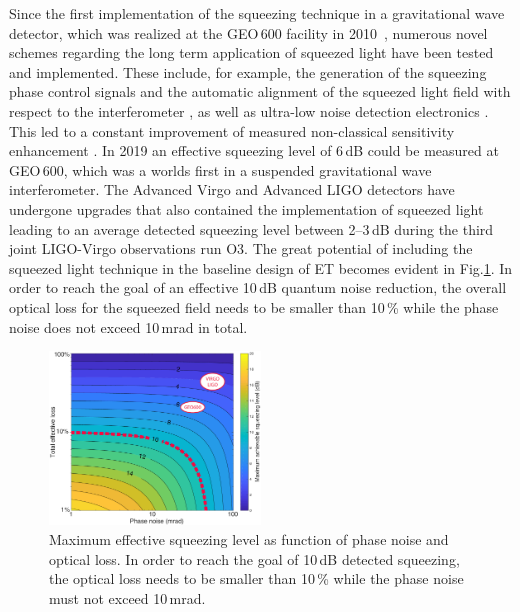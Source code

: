 \label{subsec:FDS}
Since the first implementation of the squeezing technique in a gravitational wave detector, which was realized at the GEO\,600 facility in 2010~\cite{GEOsqueezing}, numerous novel schemes regarding the long term application of squeezed light have been tested and implemented. These include, for example, the generation of the squeezing phase control signals \cite{Dooley2015} and the automatic alignment of the squeezed light field with respect to the interferometer \cite{Schreiber2016}, as well as ultra-low noise detection electronics \cite{Grote2016}. This led to a constant improvement of measured non-classical sensitivity enhancement \cite {Grote2013,Dooley2016}. In 2019 an effective squeezing level of 6\,dB could be measured at GEO\,600, which was a worlds first in a suspended gravitational wave interferometer. 
The Advanced Virgo and Advanced LIGO detectors have undergone upgrades that also contained the implementation of squeezed light leading to an average detected squeezing level between 2--3\,dB during the third joint LIGO-Virgo observations run O3. 
%
The great potential of including the squeezed light technique in the baseline design of ET becomes evident in Fig.\ref{QNSQZvsPNandloss}. In order to reach the goal of an effective 10\,dB quantum noise reduction, the overall optical loss for the squeezed field needs to be smaller than 10\,\% while the phase noise does not exceed 10\,mrad in total. 
%
\begin{figure}
	\centering
		\includegraphics[width=0.5\textwidth]{./Detector/DetFigures/QNSQZvsPNandLoss.pdf}
	\caption{Maximum effective squeezing level as function of phase noise and optical loss. In order to reach the goal of 10\,dB detected squeezing, the optical loss needs to be smaller than 10\,\% while the phase noise must not exceed 10\,mrad.}
	\label{QNSQZvsPNandloss}
\end{figure}
%
